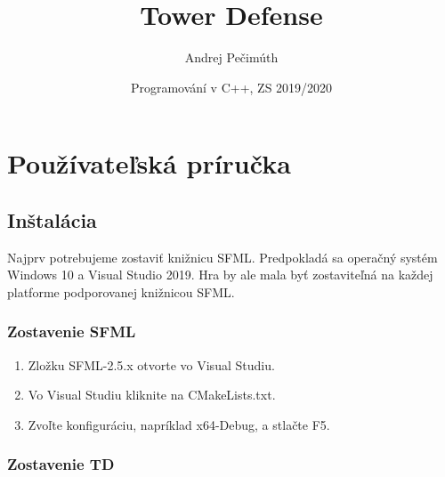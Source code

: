 \documentclass[12pt]{article}
\title{Tower Defense}
\author{Andrej Pečimúth}
\date{Programování v C++, ZS 2019/2020}
\begin{document}
\maketitle

\section{Používateľská príručka}

\subsection{Inštalácia}
Najprv potrebujeme zostaviť knižnicu SFML. Predpokladá sa operačný systém Windows 10
a Visual Studio 2019. Hra by ale mala byť zostaviteľná na každej platforme podporovanej
knižnicou SFML.

\subsubsection{Zostavenie SFML}

\begin{enumerate}
    \item Zložku SFML-2.5.x otvorte vo Visual Studiu.
    \item Vo Visual Studiu kliknite na CMakeLists.txt.
    \item Zvoľte konfiguráciu, napríklad x64-Debug, a stlačte F5.
\end{enumerate}

\subsubsection{Zostavenie TD}
\end{document}
